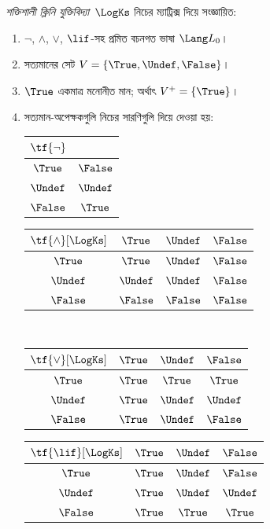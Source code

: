 \documentclass[../../../include/open-logic-section]{subfiles}
\begin{document}
\begin{defn}
\emph{শক্তিশালী ক্লিনি যুক্তিবিদ্যা}~$\LogKs$ নিচের ম্যাট্রিক্স দিয়ে
সংজ্ঞায়িত:
\begin{enumerate}
  \item $\lnot$, $\land$, $\lor$, $\lif$-সহ প্রমিত বচনগত ভাষা
  $\Lang L_0$।
  \item সত্যমানের সেট $V = \{\True, \Undef, \False\}$।
  \item $\True$ একমাত্র মনোনীত মান; অর্থাৎ $V^+ = \{\True\}$।
  \item সত্যমান-অপেক্ষকগুলি নিচের সারণিগুলি দিয়ে দেওয়া হয়:
  \begin{center}
    \begin{tabular}{c|c}
      $\tf{\lnot}$ & \\
      \hline
      $\True$ & $\False$ \\
      $\Undef$ & $\Undef$ \\
      $\False$ & $\True$
    \end{tabular}
    \quad
    \begin{tabular}{c|ccc}
      $\tf{\land}[\LogKs]$ & $\True$ & $\Undef$ & $\False$ \\
      \hline
      $\True$ & $\True$ & $\Undef$ & $\False$ \\
      $\Undef$ & $\Undef$ & $\Undef$ & $\False$\\
      $\False$ & $\False$ & $\False$ & $\False$
    \end{tabular}
    \\[2ex]
    \begin{tabular}{c|ccc}
      $\tf{\lor}[\LogKs]$ & $\True$ & $\Undef$ & $\False$ \\
      \hline
      $\True$ & $\True$ & $\True$ & $\True$ \\
      $\Undef$ & $\True$ & $\Undef$ & $\Undef$ \\
      $\False$ & $\True$ & $\Undef$ & $\False$
    \end{tabular}
    \quad
    \begin{tabular}{c|ccc}
      $\tf{\lif}[\LogKs]$ & $\True$ & $\Undef$ & $\False$ \\
      \hline
      $\True$ & $\True$ & $\Undef$ & $\False$ \\
      $\Undef$ & $\True$ & $\Undef$ & $\Undef$  \\
      $\False$ & $\True$ & $\True$ & $\True$
    \end{tabular}
  \end{center}
\end{enumerate}
\end{defn}
\end{document}
